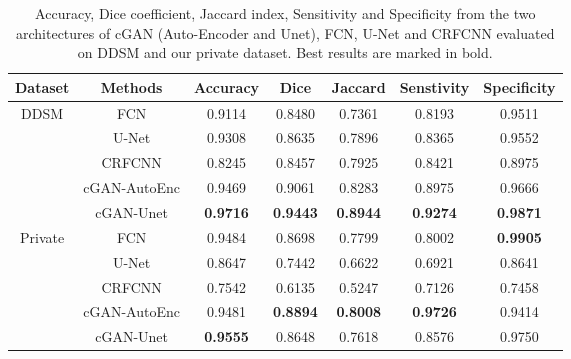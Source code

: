 \documentclass[runningheads,a4paper]{llncs}
\begin{document}
\begin{table}[!b]
\centering
\caption{Accuracy, Dice coefficient, Jaccard index, Sensitivity and Specificity from the two architectures of cGAN (Auto-Encoder and Unet), FCN, U-Net and CRFCNN evaluated on DDSM and our private dataset. Best results are marked in bold.}
\label{Table1}
\begin{tabular}{|c|c|c|c|c|c|c|}
\hline
Dataset                      & Methods         & Accuracy        & Dice            & Jaccard         & Senstivity      & Specificity     \\ \hline
\multirow{5}{*}{DDSM}        & FCN             & 0.9114          & 0.8480          & 0.7361          & 0.8193          & 0.9511          \\ \cline{2-7}
                             & U-Net           & 0.9308          & 0.8635          & 0.7896          & 0.8365          & 0.9552          \\ \cline{2-7}
                             & CRFCNN          & 0.8245          & 0.8457          & 0.7925          & 0.8421          & 0.8975          \\ \cline{2-7}
                             & cGAN-AutoEnc     & 0.9469          & 0.9061          & 0.8283          & 0.8975          & 0.9666          \\ \cline{2-7}
                             & cGAN-Unet        & \textbf{0.9716} & \textbf{0.9443} & \textbf{0.8944} & \textbf{0.9274} & \textbf{0.9871} \\ \hline
\multirow{5}{*}{Private}     & FCN             & 0.9484          & 0.8698          & 0.7799          & 0.8002          & \textbf{0.9905} \\ \cline{2-7}
                             & U-Net           & 0.8647          & 0.7442          & 0.6622          & 0.6921          & 0.8641          \\ \cline{2-7} 
                             & CRFCNN          & 0.7542          & 0.6135          & 0.5247          & 0.7126          & 0.7458          \\ \cline{2-7}
                             & cGAN-AutoEnc     & 0.9481          & \textbf{0.8894} & \textbf{0.8008} & \textbf{0.9726} & 0.9414          \\ \cline{2-7}
                             & cGAN-Unet        & \textbf{0.9555} & 0.8648          & 0.7618          & 0.8576          & 0.9750          \\ \hline
                             
                             
\end{tabular}
\end{table}
\end{document}
